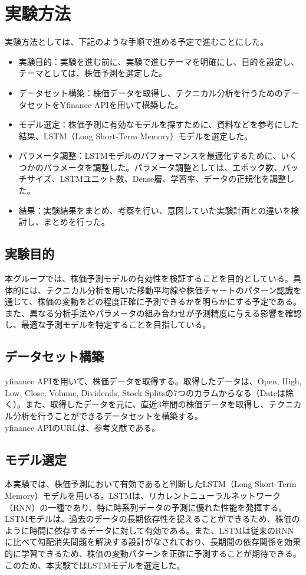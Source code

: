 \documentclass[a4paper, 11pt, titlepage]{jsarticle}
\begin{document}
\section{実験方法}
実験方法としては、下記のような手順で進める予定で進むことにした。
\begin{itemize}
  \item 実験目的：実験を進む前に、実験で進むテーマを明確にし、目的を設定し、テーマとしては、株価予測を選定した。
  \item データセット構築：株価データを取得し、テクニカル分析を行うためのデータセットをYfinance APIを用いて構築した。
  \item モデル選定：株価予測に有効なモデルを探すために、資料などを参考にした結果、LSTM（Long Short-Term Memory）モデルを選定した。
  \item パラメータ調整：LSTMモデルのパフォーマンスを最適化するために、いくつかのパラメータを調整した。パラメータ調整としては、エポック数、バッチサイズ、LSTMユニット数、Dense層、学習率、データの正規化を調整した。
  \item 結果：実験結果をまとめ、考察を行い、意図していた実験計画との違いを検討し、まとめを行った。
\end{itemize}
\subsection{実験目的}
\indent 本グループでは、株価予測モデルの有効性を検証することを目的としている。具体的には、テクニカル分析を用いた移動平均線や株価チャートのパターン認識を通じて、株価の変動をどの程度正確に予測できるかを明らかにする予定である。また、異なる分析手法やパラメータの組み合わせが予測精度に与える影響を確認し、最適な予測モデルを特定することを目指している。

\subsection{データセット構築}
\indent yfinance APIを用いて、株価データを取得する。取得したデータは、Open, High, Low, Close, Volume, Dividends, Stock Splitsの7つのカラムからなる（Dateは除く）。また、取得したデータを元に、直近3年間の株価データを取得し、テクニカル分析を行うことができるデータセットを構築する。\\
\indent yfinance APIのURLは、参考文献\cite{yfin}である。

\subsection{モデル選定}
\indent 本実験では、株価予測において有効であると判断したLSTM（Long Short-Term Memory）モデルを用いる。LSTMは、リカレントニューラルネットワーク（RNN）の一種であり、特に時系列データの予測に優れた性能を発揮する。LSTMモデルは、過去のデータの長期依存性を捉えることができるため、株価のように時間に依存するデータに対して有効である。また、LSTMは従来のRNNに比べて勾配消失問題を解決する設計がなされており、長期間の依存関係を効果的に学習できるため、株価の変動パターンを正確に予測することが期待できる。このため、本実験ではLSTMモデルを選定した。
\end{document}
